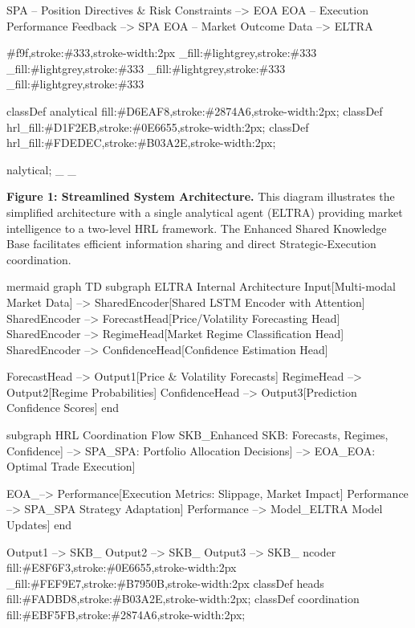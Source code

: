 \documentclass[11pt]{article}
\begin{document}
    SPA -- Position Directives \& Risk Constraints --> EOA
    EOA -- Execution Performance Feedback --> SPA
    EOA -- Market Outcome Data --> ELTRA

    \#f9f,stroke:\#333,stroke-width:2px
    \_{\text{\1}}\2fill:\#lightgrey,stroke:\#333
    \_{\text{\1}}\2fill:\#lightgrey,stroke:\#333
    \_{\text{\1}}\2fill:\#lightgrey,stroke:\#333
    \_{\text{\1}}\2fill:\#lightgrey,stroke:\#333

    classDef analytical fill:\#D6EAF8,stroke:\#2874A6,stroke-width:2px;
    classDef hrl\_{\text{\1}}\2fill:\#D1F2EB,stroke:\#0E6655,stroke-width:2px;
    classDef hrl\_{\text{\1}}\2fill:\#FDEDEC,stroke:\#B03A2E,stroke-width:2px;

    nalytical;
    \_{\text{\1}}\2
    \_{\text{\1}}\2

\textbf{Figure 1: Streamlined System Architecture.} This diagram illustrates the simplified architecture with a single analytical agent (ELTRA) providing market intelligence to a two-level HRL framework. The Enhanced Shared Knowledge Base facilitates efficient information sharing and direct Strategic-Execution coordination.

mermaid
graph TD
    subgraph ELTRA Internal Architecture
        Input[Multi-modal Market Data] --> SharedEncoder[Shared LSTM Encoder with Attention]
        SharedEncoder --> ForecastHead[Price/Volatility Forecasting Head]
        SharedEncoder --> RegimeHead[Market Regime Classification Head]
        SharedEncoder --> ConfidenceHead[Confidence Estimation Head]
        
        ForecastHead --> Output1[Price \& Volatility Forecasts]
        RegimeHead --> Output2[Regime Probabilities]
        ConfidenceHead --> Output3[Prediction Confidence Scores]
    end

    subgraph HRL Coordination Flow
        SKB\_{\text{\1}}\2Enhanced SKB: Forecasts, Regimes, Confidence] 
        --> SPA\_{\text{\1}}\2SPA: Portfolio Allocation Decisions]
        --> EOA\_{\text{\1}}\2EOA: Optimal Trade Execution]
        
        EOA\_{\text{\1}}\2--> Performance[Execution Metrics: Slippage, Market Impact]
        Performance --> SPA\_{\text{\1}}\2SPA Strategy Adaptation]
        Performance --> Model\_{\text{\1}}\2ELTRA Model Updates]
    end

    Output1 --> SKB\_{\text{\1}}\2    Output2 --> SKB\_{\text{\1}}\2    Output3 --> SKB\_{\text{\1}}\2
    ncoder fill:\#E8F6F3,stroke:\#0E6655,stroke-width:2px
    \_{\text{\1}}\2fill:\#FEF9E7,stroke:\#B7950B,stroke-width:2px
    classDef heads fill:\#FADBD8,stroke:\#B03A2E,stroke-width:2px;
    classDef coordination fill:\#EBF5FB,stroke:\#2874A6,stroke-width:2px;
    
\end{document}
